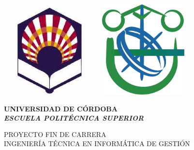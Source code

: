 %
%

%

\begin{titlepage}

	\begin{center}

		\includegraphics[width=5cm, height=5cm]{./img/logo_uco.eps}
		\hspace{3cm}
		\includegraphics[width=5cm, height=5cm]{./img/logo_eps.eps}
		\vspace{2cm}

		{\Large{\textbf{UNIVERSIDAD DE CÓRDOBA}}}
		\\
		{\it \large{\textbf{ESCUELA POLITÉCNICA SUPERIOR}}}
		\vspace{1cm}

		{\large PROYECTO FIN DE CARRERA\\INGENIERÍA TÉCNICA EN INFORMÁTICA DE GESTIÓN}
		\vspace{1cm}


\end{center}
\end{titlepage}
